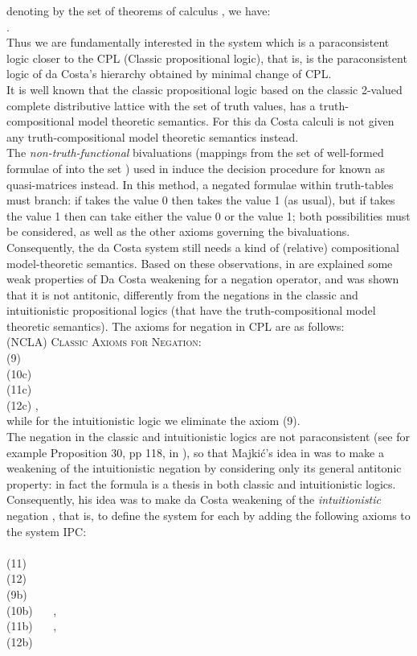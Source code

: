 \documentclass{llncs}
\begin{document}
 denoting by  the set of theorems of  calculus , we
 have:\\
 .\\
 Thus we are fundamentally interested in the  system which is a paraconsistent logic
 closer  to the CPL (Classic propositional logic), that is,  is the paraconsistent
 logic of da Costa's hierarchy
 obtained by minimal change of CPL.\\
 It is well known that the classic propositional logic based on the classic 2-valued complete distributive lattice  with  the set  of truth values, has a
 truth-compositional model theoretic semantics.
 For this da Costa calculi is not given any truth-compositional
 model  theoretic semantics instead.\\
  The \emph{non-truth-functional} bivaluations (mappings from the set of well-formed formulae of
  into the set ) used in \cite{CoAl77,LoAl80}
 induce the decision procedure for  known as quasi-matrices
 instead. In this method, a negated formulae within truth-tables
 must branch: if  takes the value 0 then  takes the value
 1 (as usual), but if  takes the value 1 then  can take
 either the value 0 or the value 1; both possibilities must be
 considered, as well as the other axioms governing the
 bivaluations.\\
  Consequently, the da Costa system still
 needs a kind of (relative) compositional model-theoretic
 semantics.
 Based on these observations, in \cite{Majk08dc}   are explained some weak properties of Da Costa
 weakening for a negation operator, and was shown that it is not antitonic, differently from the negations in the classic
  and intuitionistic propositional logics (that
 have the truth-compositional
 model  theoretic semantics).
 The axioms for negation in CPL are as follows:\\
 \textsc{(NCLA) Classic Axioms for Negation:} \\
(9) \\
(10c) \\
(11c) \\
(12c) ,  \\
while for the intuitionistic logic we eliminate the
axiom (9).\\
 The negation in the classic and intuitionistic logics are not paraconsistent
 (see for example Proposition 30, pp 118, in \cite{Majk06ml}), so
 that  Majki\'c's idea in \cite{Majk08dc} was to make a weakening
 of the intuitionistic negation by considering only its general
 antitonic property: in fact the formula  is a thesis in both classic and intuitionistic
 logics. Consequently, his idea was to make  da Costa weakening of the \emph{intuitionistic} negation \cite{Majk08dc}, that is, to define the system 
for each  by adding the following axioms to the system IPC:\\\\
\noindent (11) \ \ \ \\
\noindent (12) \ \ \ \\
\noindent (9b) \ \ \ \\
\noindent (10b) \ \ \ , \\
\noindent (11b) \ \ \ , \\
\noindent (12b) \ \ \ 
\end{document}
